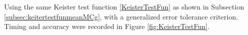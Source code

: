 \documentclass{iitthesis}
\theoremstyle{definition}
\begin{document}
Using the same Keister test function \eqref{KeisterTestFun} as shown in Subsection \ref{subsec:keitertestfunmeanMCg}, with a generalized error tolerance criterion. Timing and accuracy were recorded in Figure \ref{fig:KeisterTestFun}.
%
\end{document}
